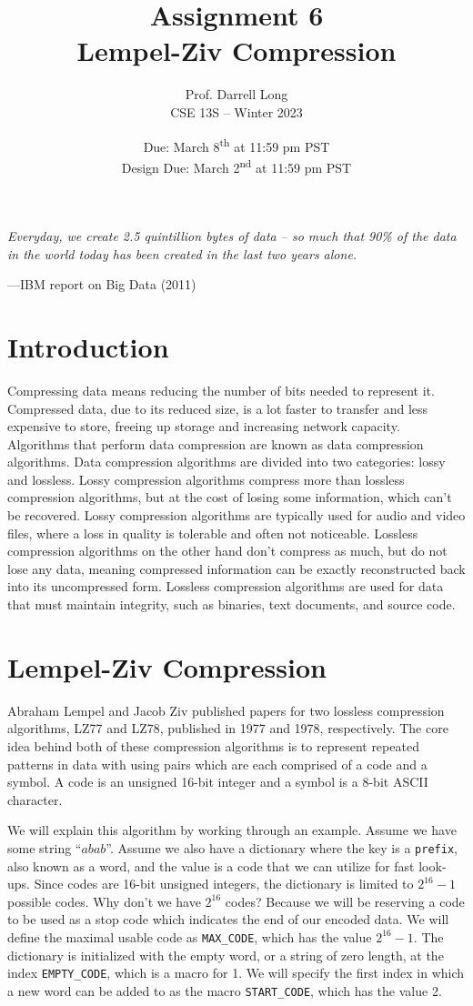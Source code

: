 \documentclass{article}
\title{Assignment 6 \\ Lempel-Ziv Compression}
\author{Prof. Darrell Long \\
CSE 13S -- Winter 2023}
\date{Due: March 8\textsuperscript{th} at 11:59 pm PST \\ Design Due: March
2\textsuperscript{nd} at 11:59 pm PST }
\begin{document}
\maketitle

\textwidth
\epigraph{\emph{Everyday, we create 2.5 quintillion bytes of data -- so much
that 90\% of the data in the world today has been created in the last two years
alone.}}{---IBM report on Big Data (2011)}

\section{Introduction}
Compressing data means reducing the number of bits needed to represent it.
Compressed data, due to its reduced size, is a lot faster to transfer and less
expensive to store, freeing up storage and increasing network capacity.
Algorithms that perform data compression are known as data compression
algorithms. Data compression algorithms are divided into two categories: lossy
and lossless.  Lossy compression algorithms compress more than lossless
compression algorithms, but at the cost of losing some information, which can't
be recovered. Lossy compression algorithms are typically used for audio and
video files, where a loss in quality is tolerable and often not noticeable.
Lossless compression algorithms on the other hand don't compress as much, but do
not lose any data, meaning compressed information can be exactly reconstructed
back into its uncompressed form. Lossless compression algorithms are used for
data that must maintain integrity, such as binaries, text documents, and source
code.

\section{Lempel-Ziv Compression}
Abraham Lempel and Jacob Ziv published papers for two lossless compression
algorithms, LZ77 and LZ78, published in 1977 and 1978, respectively. The core
idea behind both of these compression algorithms is to represent repeated
patterns in data with using pairs which are each comprised of a code and a
symbol. A code is an unsigned 16-bit integer and a symbol is a 8-bit ASCII
character.

We will explain this algorithm by working through an example.
Assume we have some string ``$abab$''. Assume we also have a
dictionary where the key is a \texttt{prefix}, also known as a word, and the value is a
code that we can utilize for fast look-ups. Since codes are 16-bit unsigned
integers, the dictionary is limited to $2^{16} - 1$ possible codes.
Why don't we have $2^{16}$ codes? Because we will be reserving a code to be used
as a stop code which indicates the end of our encoded data. We will define the
maximal usable code as \texttt{MAX\_CODE}, which has the value $2^{16} - 1$. The
dictionary is initialized with the empty word, or a string of zero length, at
the index \texttt{EMPTY\_CODE}, which is a macro for 1. We will specify the
first index in which a new word can be added to as the macro
\texttt{START\_CODE}, which has the value 2.
\end{document}
